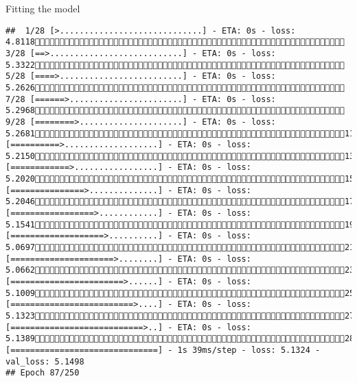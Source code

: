 \documentclass[
  ignorenonframetext,
]{beamer}
\begin{document}
\begin{frame}[fragile]{Fitting the model}
\begin{verbatim}
##  1/28 [>.............................] - ETA: 0s - loss: 4.8118 3/28 [==>...........................] - ETA: 0s - loss: 5.3322 5/28 [====>.........................] - ETA: 0s - loss: 5.2626 7/28 [======>.......................] - ETA: 0s - loss: 5.2968 9/28 [========>.....................] - ETA: 0s - loss: 5.268111/28 [==========>...................] - ETA: 0s - loss: 5.215013/28 [============>.................] - ETA: 0s - loss: 5.202015/28 [===============>..............] - ETA: 0s - loss: 5.204617/28 [=================>............] - ETA: 0s - loss: 5.154119/28 [===================>..........] - ETA: 0s - loss: 5.069721/28 [=====================>........] - ETA: 0s - loss: 5.066223/28 [=======================>......] - ETA: 0s - loss: 5.100925/28 [=========================>....] - ETA: 0s - loss: 5.132327/28 [===========================>..] - ETA: 0s - loss: 5.138928/28 [==============================] - 1s 39ms/step - loss: 5.1324 - val_loss: 5.1498
## Epoch 87/250

\end{verbatim}
\end{frame}
\end{document}

